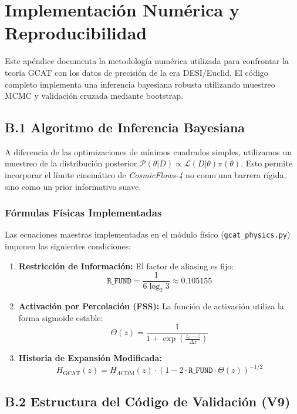 \documentclass[12pt, a4paper]{article}
\theoremstyle{plain}
\theoremstyle{definition}
\begin{document}
\section{Implementación Numérica y Reproducibilidad}
\label{app:codigo}

Este apéndice documenta la metodología numérica utilizada para confrontar la teoría GCAT con los datos de precisión de la era DESI/Euclid. El código completo implementa una inferencia bayesiana robusta utilizando muestreo MCMC y validación cruzada mediante bootstrap.

\subsection{B.1 Algoritmo de Inferencia Bayesiana}

A diferencia de las optimizaciones de mínimos cuadrados simples, utilizamos un muestreo de la distribución posterior $\mathcal{P}(\theta|D) \propto \mathcal{L}(D|\theta)\pi(\theta)$. Esto permite incorporar el límite cinemático de \textit{CosmicFlows-4} no como una barrera rígida, sino como un prior informativo suave.

\subsubsection{Fórmulas Físicas Implementadas}

Las ecuaciones maestras implementadas en el módulo físico (\texttt{gcat\_physics.py}) imponen las siguientes condiciones:

\begin{enumerate}
    \item \textbf{Restricción de Información:} El factor de aliasing es fijo:
    \[
    \texttt{R\_FUND} = \frac{1}{6 \log_2 3} \approx 0.105155
    \]
    
    \item \textbf{Activación por Percolación (FSS):} La función de activación utiliza la forma sigmoide estable:
    \[
    \Theta(z) = \frac{1}{1 + \exp\left(\frac{z_c - z}{\Delta z}\right)}
    \]
    
    \item \textbf{Historia de Expansión Modificada:}
    \[
    H_{\text{GCAT}}(z) = H_{\Lambda\text{CDM}}(z) \cdot \left(1 - 2 \cdot \texttt{R\_FUND} \cdot \Theta(z)\right)^{-1/2}
    \]
\end{enumerate}

\subsection{B.2 Estructura del Código de Validación (V9)}
\end{document}
